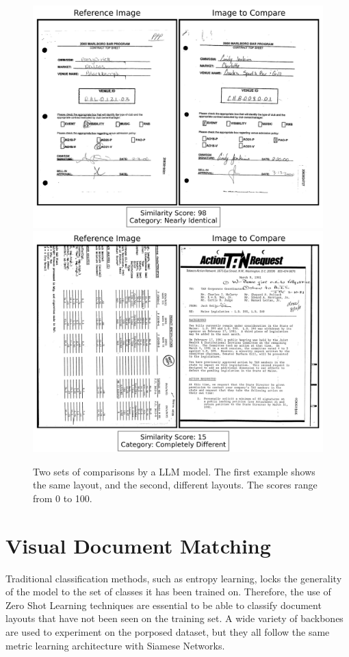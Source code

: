 \begin{figure}[htbp]
    \centering
    \includegraphics[width=.8\linewidth]{images/similar.png}
    \\[1em]
    \centering
    \includegraphics[width=.8\linewidth]{images/different.png}
    \caption{Two sets of comparisons by a LLM model. The first example shows the same layout, and the second, different layouts. The scores range from 0 to 100.}
    \label{fig:document_comparison}
\end{figure}

\section{Visual Document Matching}
\label{sec:method_modeling}

Traditional classification methods, such as entropy learning, locks the generality of the model to the set of classes it has been trained on. Therefore, the use of Zero Shot Learning techniques are essential to be able to classify document layouts that have not been seen on the training set. A wide variety of backbones are used to experiment on the porposed dataset, but they all follow the same metric learning architecture with Siamese Networks.

